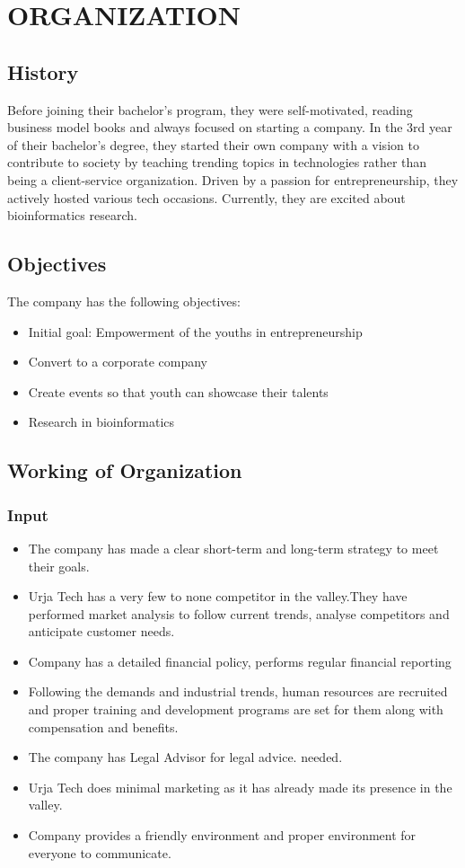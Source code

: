 
\chapter{ORGANIZATION}
      \section{History}
      Before joining their bachelor's program, they were self-motivated, reading business model books and always focused on starting a company. In the 3rd year of their bachelor's degree, they started their own company with a vision to contribute to society by teaching trending topics in technologies rather than being a client-service organization. Driven by a passion for entrepreneurship, they actively hosted various tech occasions. Currently, they are excited about bioinformatics research.
      
      \section{Objectives}
      The company has the following objectives:
      \begin{itemize}
        \item Initial goal: Empowerment of the youths in entrepreneurship
        \item Convert to a corporate company
        \item Create events so that youth can showcase their talents
        \item Research in bioinformatics
      \end{itemize}

      \section{Working of Organization}
      \subsection{Input}
        \begin{itemize}
          \item The company has made a clear short-term and long-term strategy to meet their goals.
          \item Urja Tech has a very few to none competitor in the valley.They have performed market analysis to follow current trends, analyse competitors and anticipate customer needs.
          \item Company has a detailed financial policy, performs regular financial reporting
          \item Following the demands and industrial trends, human resources are recruited and proper training and development programs are set for them along with compensation and benefits.
          \item The company has Legal Advisor for legal advice. needed.
          \item Urja Tech does minimal marketing as it has already made its presence in the valley.
          \item Company provides a friendly environment and proper environment for everyone to communicate.
      \end{itemize}
